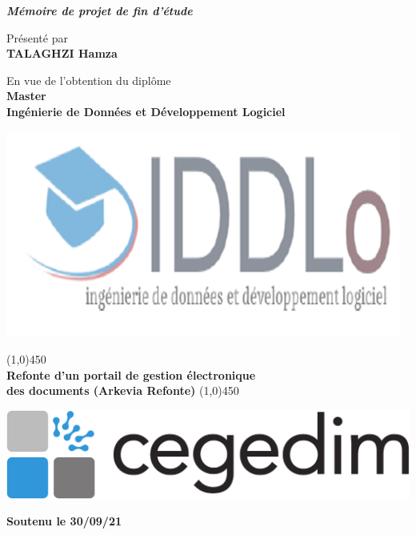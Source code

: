 \begin{center}
    \thispagestyle{empty}
    \emph{\Large\textbf{Mémoire de projet de fin d’étude}}\\
    
    \vspace*{0.4cm}

    {\normalsize Présenté par}\\
    \Large\textbf{TALAGHZI Hamza}\\

    \vspace*{0.6cm}

    \normalsize

    En vue de l’obtention du diplôme\\

    \textbf{Master}\\
    \large
    \textbf{Ingénierie de Données et Développement Logiciel}\\
    
    \vspace*{0.5cm}
    
    \includegraphics[width=0.25\linewidth]{images/iddl.png}

    \vspace*{0.35cm}
    \line(1,0){450}\\
    \bigskip
    \noindent \Large \textbf{Refonte d’un portail de gestion électronique \\des documents (Arkevia Refonte)}
    \line(1,0){450}\\
    
    \vspace*{0.5cm}
    
    \includegraphics[width=0.31\linewidth]{images/sec1/cegedim-logo.pdf}
    
    \vspace*{0.3cm}

   \normalsize \textbf{Soutenu le 30/09/21}

   \vspace*{0.3cm}


\end{center}
